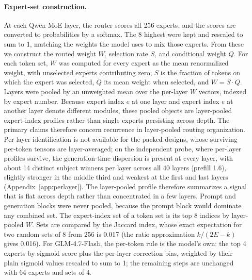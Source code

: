 \paragraph{Expert-set construction.} At each Qwen MoE layer, the router scores all 256 experts, and the scores are converted to probabilities by a softmax. The 8 highest were kept and rescaled to sum to 1, matching the weights the model uses to mix those experts. From these we construct the routed weight $W$, selection rate $S$, and conditional weight $Q$. For each token set, $W$ was computed for every expert as the mean renormalized weight, with unselected experts contributing zero; $S$ is the fraction of tokens on which the expert was selected, $Q$ its mean weight when selected, and $W = S \cdot Q$. Layers were pooled by an unweighted mean over the per-layer $W$ vectors, indexed by expert number. Because expert index $e$ at one layer and expert index $e$ at another layer denote different modules, these pooled objects are layer-pooled expert-index profiles rather than single experts persisting across depth. The primary claims therefore concern recurrence in layer-pooled routing organization. Per-layer identification is not available for the packed designs, whose surviving per-token tensors are layer-averaged; on the independent probe, where per-layer profiles survive, the generation-time dispersion is present at every layer, with about 14 distinct subject winners per layer across all 40 layers (prefill 1.6), slightly stronger in the middle third and weakest at the first and last layers (Appendix~\ref{app:perlayer}). The layer-pooled profile therefore summarizes a signal that is flat across depth rather than concentrated in a few layers. Prompt and generation blocks were never pooled, because the prompt block would dominate any combined set. The expert-index set of a token set is its top 8 indices by layer-pooled $W$. Sets are compared by the Jaccard index, whose exact expectation for two random sets of 8 from 256 is 0.017 (the ratio approximation $k/(2E-k)$ gives 0.016). For GLM-4.7-Flash, the per-token rule is the model's own: the top 4 experts by sigmoid score plus the per-layer correction bias, weighted by their plain sigmoid values rescaled to sum to 1; the remaining steps are unchanged with 64 experts and sets of 4.


